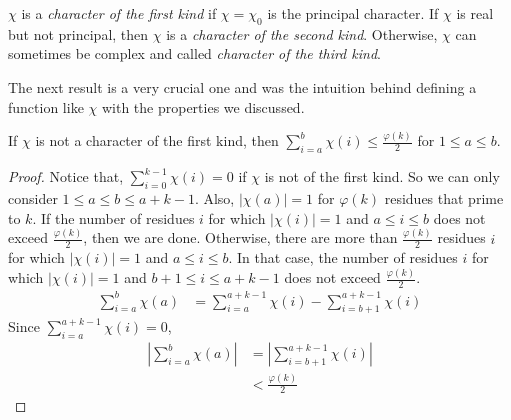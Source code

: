 \documentclass[elemannt.tex]{subfile}
\begin{document}
		\begin{definition}
			$\chi$ is a \textit{character of the first kind} if $\chi=\chi_{0}$ is the principal character. If $\chi$ is real but not principal, then $\chi$ is a \textit{character of the second kind}. Otherwise, $\chi$ can sometimes be complex and called \textit{character of the third kind}.
		\end{definition}
	The next result is a very crucial one and was the intuition behind defining a function like $\chi$ with the properties we discussed.
		\begin{proposition}
			If $\chi$ is not a character of the first kind, then $\sum_{i=a}^{b}\chi(i)\leq \frac{\varphi(k)}{2}$ for $1\leq a\leq b$.
		\end{proposition}

		\begin{proof}
			Notice that, $\sum_{i=0}^{k-1}\chi(i)=0$ if $\chi$ is not of the first kind. So we can only consider $1\leq a\leq b\leq a+k-1$. Also, $|\chi(a)|=1$ for $\varphi(k)$ residues that prime to $k$. If the number of residues $i$ for which $|\chi(i)|=1$ and $a\leq i\leq b$ does not exceed $\frac{\varphi(k)}{2}$, then we are done. Otherwise, there are more than $\frac{\varphi(k)}{2}$ residues $i$ for which $|\chi(i)|=1$ and $a\leq i\leq b$. In that case, the number of residues $i$ for which $|\chi(i)|=1$ and $b+1\leq i\leq a+k-1$ does not exceed $\frac{\varphi(k)}{2}$.
				\begin{align*}
					\sum_{i=a}^{b}\chi(a)
						& = \sum_{i=a}^{a+k-1}\chi(i)-\sum_{i=b+1}^{a+k-1}\chi(i)
				\end{align*}
			Since $\sum_{i=a}^{a+k-1}\chi(i)=0$,
				\begin{align*}
					\left|\sum_{i=a}^{b}\chi(a)\right|
						& = \left|\sum_{i=b+1}^{a+k-1}\chi(i)\right|\\
						& < \frac{\varphi(k)}{2}
				\end{align*}
		\end{proof}
\end{document}
